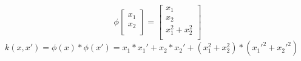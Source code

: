 \[
	\phi \left[
	\begin{matrix}
		x_{1} \\
		x_{2} \\
	\end{matrix}\right]=\left[
	\begin{matrix}
		x_{1}                \\
		x_{2}                \\
		x_{1}^{2}+ x_{2}^{2} \\
	\end{matrix}\right]
\]
$k(x, x') = \phi(x) * \phi(x') = x_{1}*x_{1}' + x_{2}* x_{2}' + (x_{1}^{2}+ x_{2}
^{2}) * (x_{1}'^{2}+ x_{2}'^{2})$